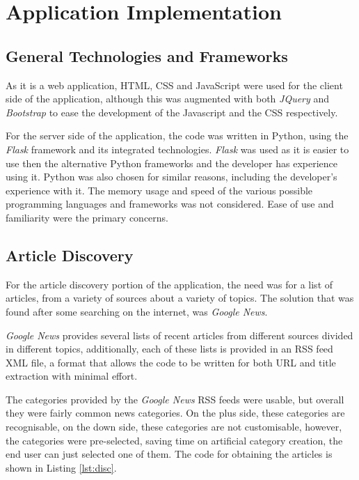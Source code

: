 \chapter{Application Implementation}

\section{General Technologies and Frameworks}

As it is a web application, HTML, CSS and JavaScript were used for the client side of the application, although this was augmented with both \textit{JQuery} and \textit{Bootstrap} to ease the development of the Javascript and the CSS respectively. 

For the server side of the application, the code was written in Python, using the \textit{Flask} framework and its integrated technologies. \textit{Flask} was used as it is easier to use then the alternative Python frameworks and the developer has experience using it. Python was also chosen for similar reasons, including the developer's experience with it. The memory usage and speed of the various possible programming languages and frameworks was not considered. Ease of use and familiarity were the primary concerns. 

\section{Article Discovery}

For the article discovery portion of the application, the need was for a list of articles, from a variety of sources about a variety of topics. The solution that was found after some searching on the internet, was \textit{Google News}.

\textit{Google News} provides several lists of recent articles from different sources divided in different topics, additionally, each of these lists is provided in an RSS feed XML file, a format that allows the code to be written for both URL and title extraction with minimal effort.

The categories provided by the \textit{Google News} RSS feeds were usable, but overall they were fairly common news categories. On the plus side, these categories are recognisable, on the down side, these categories are not customisable, however, the categories were pre-selected, saving time on artificial category creation, the end user can just selected one of them. The code for obtaining the articles is shown in Listing \ref{lst:disc}.

